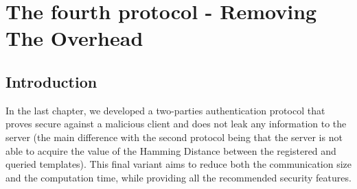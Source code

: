 \chapter{The fourth protocol - Removing The Overhead}
\label{chap:fourthProtocol}

\ifpdf
    \graphicspath{{Chapter7/Figs/Raster/}{Chapter7/Figs/PDF/}{Chapter7/Figs/}}
\else
    \graphicspath{{Chapter7/Figs/Vector/}{Chapter7/Figs/}}
\fi


\section{Introduction}
\label{sec:6intro}
In the last chapter, we developed a two-parties authentication protocol that
proves secure against a malicious client and does not leak any information to the
server (the main difference with the second protocol being that the server is not able to acquire the
value of the Hamming Distance between the registered and queried templates). This final variant aims to reduce both the communication
size and the computation time, while providing all the recommended security
features.
